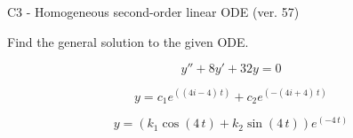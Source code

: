 \begin{exercise}
  \begin{exerciseTitle}C3 - Homogeneous second-order linear ODE (ver. 57)\end{exerciseTitle}
  \begin{exerciseStatement}
    
Find the general solution to the given ODE.

    
\[y''+8y'+32y = 0\]

  \end{exerciseStatement}
  \begin{exerciseAnswer}
    
\[y= c_{1} e^{\left(\left(4 i - 4\right) \, t\right)} + c_{2} e^{\left(-\left(4 i + 4\right) \, t\right)}\]

    
\[y= {\left(k_{1} \cos\left(4 \, t\right) + k_{2} \sin\left(4 \, t\right)\right)} e^{\left(-4 \, t\right)}\]

  \end{exerciseAnswer}
\end{exercise}